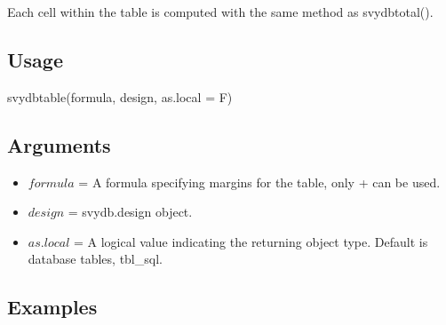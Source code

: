Each cell within the table is computed with the same method as {\ttfamily svydbtotal()}.

\subsection{Usage}
\begin{center}
    {\ttfamily svydbtable(formula, design, as.local = F)}
\end{center}
\subsection{Arguments}
\begin{itemize}
\item $formula$ = A formula specifying margins for the table, only + can be used.

\item $design$ = svydb.design object.

\item $as.local$ = A logical value indicating the returning object type. Default is database tables, {\ttfamily tbl\_sql}.
\end{itemize}

\subsection{Examples}


